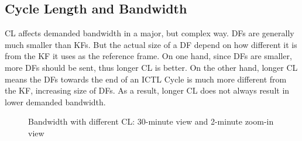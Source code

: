 \documentclass[12pt]{report}
\begin{document}
\subsection{Cycle Length and Bandwidth}
\label{sec:cl_bandwidth}

CL affects demanded bandwidth in a major, but complex way. DFs are generally much smaller than KFs. But the actual size of a DF depend on how different it is from the KF it uses as the reference frame. On one hand, since DFs are smaller, more DFs should be sent, thus longer CL is better. On the other hand, longer CL means the DFs towards the end of an ICTL Cycle is much more different from the KF, increasing size of DFs. As a result, longer CL does not always result in lower demanded bandwidth.

\begin{figure}[h]
  \caption{\label{fig:cl}Bandwidth with different CL: 30-minute view and 2-minute zoom-in view}
\end{figure}
\end{document}
